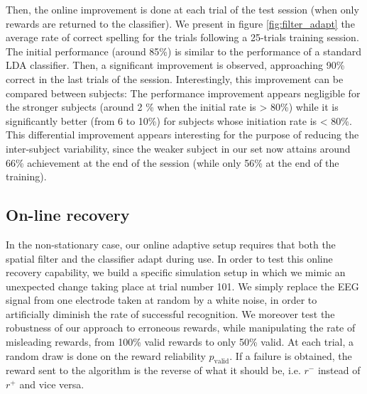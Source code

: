 \documentclass[conference]{IEEEtran}
\begin{document}
Then, the online improvement
is done at each trial of the test session (when only rewards are returned to the classifier).
We present in figure \ref{fig:filter_adapt} the average rate of correct spelling for the trials
following a 25-trials training session. The initial performance (around 85\%) is similar to 
the performance of a standard LDA classifier. Then, a significant improvement is observed, approaching
90\% correct in the last trials of the session.
Interestingly, this improvement can be compared between subjects: The performance improvement
appears negligible for the stronger subjects (around 2 \% when the initial rate is > 80\%) while it
is significantly better (from 6 to 10\%) for subjects whose initiation rate is < 80\%. 
This differential improvement appears interesting for the purpose of reducing the inter-subject
variability, since the weaker subject in our set now attains around 66\% achievement at the end of the session
(while only 56\% at the end of the training). 


\subsection{On-line recovery} \label{sec:sp_filt_rec}

In the non-stationary case, our online adaptive setup requires that both the spatial filter and 
the classifier adapt during  use.
In order to test this online recovery capability, we build a specific simulation setup in which we mimic an unexpected 
change taking place at trial number 101. We simply replace the EEG signal from one electrode taken at random 
by a white noise, in order to artificially diminish the rate of successful recognition.
We moreover test the robustness of our approach to erroneous rewards, while manipulating
the rate of misleading rewards, from 100\% valid rewards to only 50\% valid.
At each trial, a random draw is done on the reward reliability $p_\text{valid}$. If a failure is obtained, 
the reward sent to the algorithm is the reverse of what it should be, i.e. $r^-$ instead of $r^+$ and vice versa.
\end{document}
